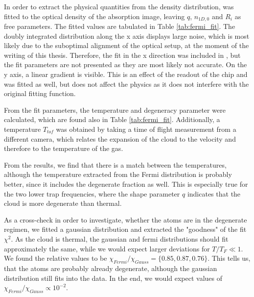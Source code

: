 In order to extract the physical quantities from the density distribution,  was fitted to the optical density of the absorption image, leaving $q$, $n_{1D,0}$ and $R_i$ as free parameters. The fitted values are tabulated in Table \ref{tab:fermi_fit}. The doubly integrated distribution along the x axis displays large noise, which is most likely due to the suboptimal alignment of the optical setup, at the moment of the writing of this thesis. Therefore, the fit in the x direction was included in , but the fit parameters are not presented as they are most likely not accurate. On the y axis, a linear gradient is visible. This is an effect of the readout of the chip and was fitted as well, but does not affect the physics as it does not interfere with the original fitting function.

From the fit parameters, the temperature and degeneracy parameter were calculated, which are found also in Table \ref{tab:fermi_fit}. Additionally, a temperature $T_{tof}$ was obtained by taking a time of flight measurement from a different camera, which relates the expansion of the cloud to the velocity and therefore to the temperature of the gas.

From the results, we find that there is a match between the temperatures, although the temperature extracted from the Fermi distribution is probably better, since it includes the degenerate fraction as well. This is especially true for the two lower trap frequencies, where the shape parameter $q$ indicates that the cloud is more degenerate than thermal.

As a cross-check in order to investigate, whether the atoms are in the degenerate regimen, we fitted a gaussian distribution and extracted the "goodness" of the fit $\chi^2$. As the cloud is thermal, the gaussian and fermi distributions should fit approximately the same, while we would expect larger deviations for $T/T_F \ll 1$. We found the relative values to be $\chi_{Fermi} / \chi_{Gauss} = \{0.85, 0.87, 0.76\}$. This tells us, that the atoms are probably already degenerate, although the gaussian distribution still fits into the data. In the end, we would expect values of $\chi_{Fermi} / \chi_{Gauss} \propto 10^{-2}$.

